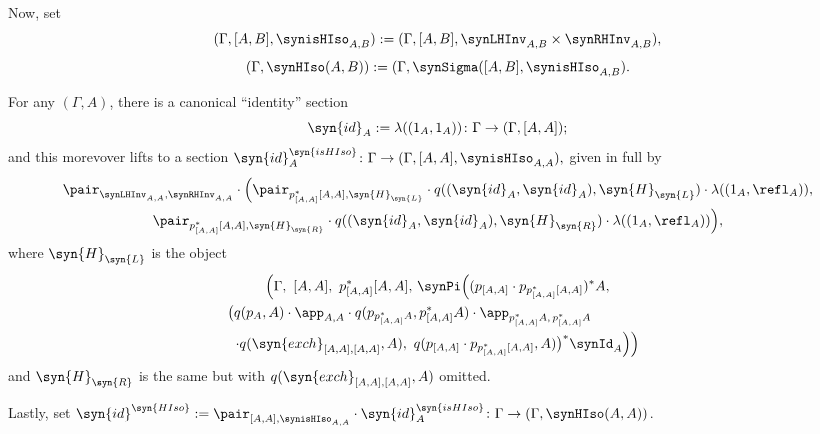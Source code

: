 \begin{definition}

Now, set 
\[ (\Gamma,[A,B],\synisHIso_{A,B}) := (\Gamma,[A,B],\synLHInv_{A,B} \times \synRHInv_{A,B}), \]
\[ (\Gamma,\synHIso(A,B)) := (\Gamma,\synSigma([A,B],\synisHIso_{A,B}). \]
\end{definition}

\begin{definition}
For any $(\Gamma,A)$, there is a canonical ``identity'' section 
  \[ \syn{id}_A := \lambda( (1_A,1_A) ) \colon \Gamma \to (\Gamma,[A,A]); \]
and this morevover lifts to a section
$ \syn{id}^{\syn{isHIso}}_A \colon \Gamma \to (\Gamma,[A,A],\synisHIso_{A,A}), $
given in full by
\begin{multline*}
  \pair_{\synLHInv_{A,A},\synRHInv_{A,A}} \cdot \Big( %
  \pair_{p_{[A,A]}^*[A,A], \syn{H}_{\syn{L}} } \cdot q( (\syn{id}_A, \syn{id}_A), \syn{H}_{\syn{L}}) \cdot \lambda((1_A,\refl_A)),\\
  \pair_{p_{[A,A]}^*[A,A], \syn{H}_{\syn{R}} } \cdot q( (\syn{id}_A, \syn{id}_A), \syn{H}_{\syn{R}}) \cdot \lambda((1_A,\refl_A))  \Big),
\end{multline*}
where $\syn{H}_{\syn{L}}$ is the object
\begin{multline*}
  \Big(\Gamma,\ [A,A],\ p_{[A,A]}^*[A,A] ,\, \synPi \Big( (p_{[A,A]}  \cdot p_{p_{[A,A]}^*[A,A]})^*A, \\
  \big(q(p_A,A) \cdot \app_{A,A} \cdot q(p_{p_{[A,A]}^*A},p_{[A,A]}^*A) \cdot \app_{p_{[A,A]}^*A,\,p_{[A,A]}^*A}  \qquad \qquad \\
  \cdot q(\syn{exch}_{[A,A],[A,A]},A),\ q(p_{[A,A]} \cdot p_{p_{[A,A]}^*[A,A]},A)\big)^*\synId_A \Big) \Big)
\end{multline*}
and $\syn{H}_{\syn{R}}$ is the same but with $q(\syn{exch}_{[A,A],[A,A]},A)$ omitted. 

Lastly, set $\syn{id}^{\syn{HIso}} := \pair_{[A,A],\synisHIso_{A,A}} \cdot \syn{id}^{\syn{isHIso}}_A \colon \Gamma \to (\Gamma, \synHIso(A,A))$.
\end{definition}

